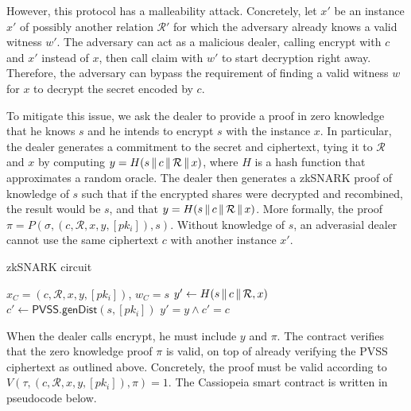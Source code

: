 However, this protocol has a malleability attack.
Concretely, let $x'$ be an instance $x'$ of possibly another relation $\mathcal{R}'$ for which the adversary already knows a valid witness $w'$.
The adversary can act as a malicious dealer, calling \textsf{encrypt} with $c$ and $x'$ instead of $x$, then call \textsf{claim} with $w'$ to start decryption right away.
Therefore, the adversary can bypass the requirement of finding a valid witness $w$ for $x$ to decrypt the secret encoded by $c$.

To mitigate this issue, we ask the dealer to provide a proof in zero knowledge that he knows $s$ and he intends to encrypt $s$ with the instance $x$.
In particular, the dealer generates a commitment to the secret and ciphertext, tying it to $\mathcal{R}$ and $x$ by computing $y = H(s \,\|\, c \,\|\, \mathcal{R} \,\|\, x)$, where $H$ is a hash function that approximates a random oracle.
The dealer then generates a zkSNARK proof of knowledge of $s$ such that if the encrypted shares were decrypted and recombined, the result would be $s$, and that $y = H(s \,\|\, c \,\|\, \mathcal{R} \,\|\, x)$.
More formally, the proof $\pi = P(\sigma, (c, \mathcal{R}, x, y, [pk_i]), s)$.
Without knowledge of $s$, an adverasial dealer cannot use the same ciphertext $c$ with another instance $x'$.

\begin{algorithm}
    \caption{zkSNARK circuit}
    \label{alg:snark_circuit}
    \begin{algorithmic}[1]
        \Require $x_C = (c, \mathcal{R}, x, y, [pk_i])$, $w_C = s$
        \State $y' \gets H(s \,\|\, c \,\|\, \mathcal{R}, x)$
        \State $c' \gets \textsf{PVSS.genDist}(s, [pk_i])$
        \State \Return $y' = y \land c' = c$
    \end{algorithmic}
\end{algorithm}

When the dealer calls \textsf{encrypt}, he must include $y$ and $\pi$.
The contract verifies that the zero knowledge proof $\pi$ is valid, on top of already verifying the PVSS ciphertext as outlined above.
Concretely, the proof must be valid according to $V(\tau, (c, \mathcal{R}, x, y, [pk_i]), \pi) = 1$.
The Cassiopeia smart contract is written in pseudocode below.

